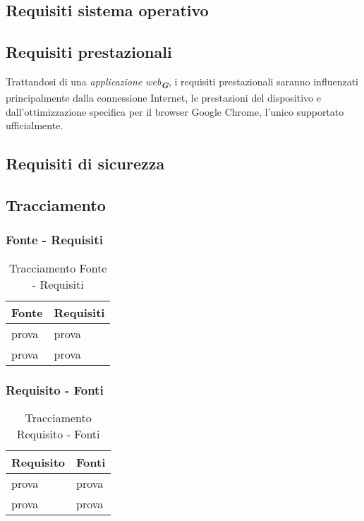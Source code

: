 \subsection{Requisiti sistema operativo}

\subsection{Requisiti prestazionali}
Trattandosi di una \emph{applicazione web}\textsubscript{\textit{\textbf{G}}}, i requisiti prestazionali saranno influenzati principalmente dalla connessione Internet, 
le prestazioni del dispositivo e dall'ottimizzazione specifica per il browser Google Chrome, l'unico supportato ufficialmente.

\subsection{Requisiti di sicurezza}

\subsection{Tracciamento}

\subsubsection{Fonte - Requisiti}
\begin{table}[h!]
    \centering
    \renewcommand{\arraystretch}{1.6} %
    \begin{tabularx}{0.8\textwidth}{|>{\centering\arraybackslash}p{2.8cm}|>{\centering\arraybackslash}X|} \hline
    \rowcolor[HTML]{FFD700} 
    \textbf{Fonte} & \textbf{Requisiti} \\ \hline
    prova & prova \\ \hline
    prova & prova \\ \hline
    \end{tabularx}
    \caption{Tracciamento Fonte - Requisiti}
    \label{tab:Tracciamento_fonte_requisiti}
\end{table}


\subsubsection{Requisito - Fonti}
\begin{table}[h!]
    \centering
    \renewcommand{\arraystretch}{1.6} %
    \begin{tabularx}{0.8\textwidth}{|>{\centering\arraybackslash}p{2.8cm}|>{\centering\arraybackslash}X|} \hline
    \rowcolor[HTML]{FFD700} 
    \textbf{Requisito} & \textbf{Fonti} \\ \hline
    prova & prova \\ \hline
    prova & prova \\ \hline
    \end{tabularx}
    \caption{Tracciamento Requisito - Fonti}
    \label{tab:Tracciamento_requisiti_fonti}
\end{table}